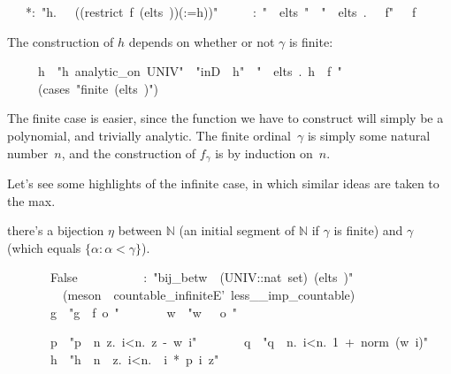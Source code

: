 \documentclass[runningheads]{llncs}
\begin{document}
\begin{isabelle}
\ \ \ *:\ "\isasymexists h.\ \isasymPhi \ \isasymgamma \ ((restrict\ f\ (elts\ \isasymgamma ))(\isasymgamma :=h))"\isanewline
\ \ \ \ \ \isasymgamma :\ "\isasymgamma \ \isasymin \ elts\ "\ \ "\isasymforall \isasymbeta \ \isasymin \ elts\ \isasymgamma .\ \isasymPhi \ \isasymbeta \ f"\ \ \isasymgamma \ f
\end{isabelle}

\noindent
The construction of $h$ depends on whether or not $\gamma$ is finite:
\begin{isabelle}
\ \ \ \ \ h\ \ "h\ analytic\_on\ UNIV"\ \ "inD\ \isasymgamma \ h"\ \ "\isasymforall \isasymbeta \ \isasymin \ elts\ \isasymgamma .\ h\ \isasymnoteq \ f\ \isasymbeta"\isanewline
\ \ \ \ \ (cases\ "finite\ (elts\ \isasymgamma )")
\end{isabelle}
%
The finite case is easier, since the function we have to construct will simply be a polynomial, and trivially analytic. The finite ordinal~$\gamma$ is simply some natural number~$n$, and the construction of $f_\gamma$ is by induction on~$n$. 

Let's see some highlights of the infinite case, in which similar ideas are taken to the max.

there's a bijection $\eta$ between $\mathbb{N}$ (an initial segment of $\mathbb{N}$ if $\gamma$ is finite) and $\gamma$ (which equals $\{\alpha:\alpha<\gamma\}$). 


\begin{isabelle}
\ \ \ \ \ \ \ False\isanewline
\ \ \ \ \ \ \ \ \isasymeta \ \ \isasymeta :\ "bij\_betw\ \isasymeta \ (UNIV::nat\ set)\ (elts\ \isasymgamma )"\isanewline
\ \ \ \ \ \ \ \ \ (meson\ \isasymgamma \ countable\_infiniteE'\ less\_\_imp\_countable)\isanewline
\ \ \ \ \ \ \ g\ \ "g\ \isasymequiv \ f\ o\ \isasymeta "\isanewline
\ \ \ \ \ \ \ w\ \ "w\ \isasymequiv \ \isasymzeta \ o\ \isasymeta "
\end{isabelle}

\begin{isabelle}
\ \ \ \ \ \ \ p\ \ "p\ \isasymequiv \ \isasymlambda n\ z.\ \isasymProd i<n.\ z\ -\ w\ i"\isanewline
\ \ \ \ \ \ \ q\ \ "q\ \isasymequiv \ \isasymlambda n.\ \isasymProd i<n.\ 1\ +\ norm\ (w\ i)"\isanewline
\ \ \ \ \ \ \ h\ \ "h\ \isasymequiv \ \isasymlambda n\ \isasymepsilon \ z.\ \isasymSum i<n.\ \isasymepsilon \ i\ *\ p\ i\ z"
\end{isabelle}
\end{document}
